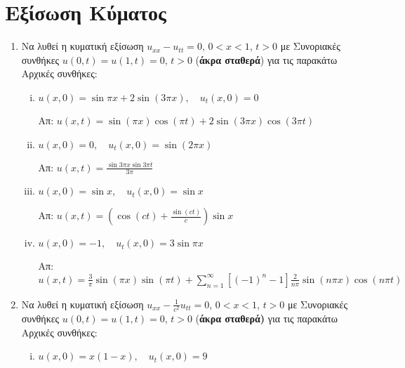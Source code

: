\documentclass[a4paper,table]{report}
\begin{document}
\begin{center}
\end{center}

\vspace{\baselineskip}

\section{Εξίσωση Κύματος}%



\begin{enumerate}

	\item Να λυθεί η κυματική εξίσωση $ u_{xx}-u_{tt} = 0 $, $ 0<x<1 $, $ t>0 $ με Συνοριακές
		συνθήκες $ u(0,t)=u(1,t)=0 $, $ t>0 $ (\textbf{άκρα σταθερά}) για τις παρακάτω Αρχικές συνθήκες: 
		\begin{enumerate}[(i)]
			\item $ u(x,0) = \sin{\pi x} + 2 \sin{(3 \pi x)},\quad  u_t(x,0) = 0 $

				\hfill Απ: $ u(x,t) = \sin{(\pi x)} \cos{(\pi t)} + 2 \sin{(3\pi x)} \cos{(3\pi t)} $
		\item $ u(x,0) = 0,\quad  u_t(x,0) = \sin{(2\pi x)} $

			\hfill Απ: $ u(x,t) = \frac{\sin{3\pi x} \sin{3\pi t}}{ 3\pi } $

		\item $ u(x,0) = \sin{x}, \quad u_t(x,0) = \sin{x} $

			\hfill Απ: $ u(x,t) = \left(\cos{(ct)} + \frac{\sin (ct) }{ c }\right) \sin{x}  $ 

		\item $ u(x,0) = -1,\quad u_t(x,0) = 3 \sin{\pi x} $

			\hfill Απ: $ u(x,t) = \frac{ 3 }{ \pi } \sin{(\pi x)} \sin{(\pi t)} +
			\sum_{n=1}^{\infty} [(-1)^{n}-1] \frac{ 2 }{ n\pi } \sin{(n\pi x)} \cos{(n\pi t)}$ 

\end{enumerate}

\item Να λυθεί η κυματική εξίσωση $ u_{xx} - \frac{1}{ c^{2} } u_{tt} = 0 $, $ 0<x<1 $, $ t>0
	$ με Συνοριακές συνθήκες $ u(0,t) = u(1,t) = 0 $, $ t>0 $ (\textbf{άκρα σταθερά)} για τις παρακάτω Αρχικές συνθήκες:

	\begin{enumerate}[(i)]
		\item $ u(x,0) = x(1-x), \quad u_t(x,0) = 9$ 



\end{enumerate}
\end{enumerate}
\end{document}
